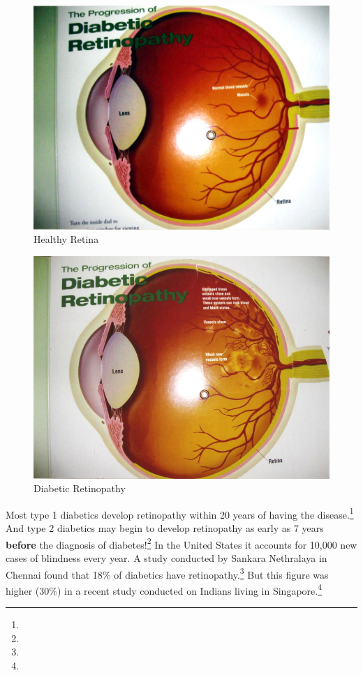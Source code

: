 {\begin{figure}
\includegraphics{images/052.jpg}
\caption{Healthy Retina}
\end{figure}


\begin{figure}
\includegraphics{images/053.jpg}
\caption{Diabetic Retinopathy}
\end{figure}

Most type 1 diabetics develop retinopathy within 20 years of having the disease.\footnote{} And type 2 diabetics may begin to develop retinopathy as early as 7 years \textbf{before} the diagnosis of diabetes!\footnote{} In the United States it accounts for 10,000 new cases of blindness every year. A study conducted by Sankara Nethralaya in Chennai found that 18\% of diabetics have retinopathy.\footnote{} But this figure was higher (30\%) in a recent study conducted on Indians living in Singapore.\footnote{}

}
